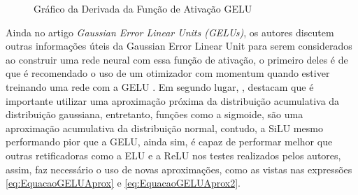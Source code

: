 \begin{figure}[htbp]
    \centering
    \caption{Gráfico da Derivada da Função de Ativação GELU}
    \label{fig:GraficoGELUDerivada}
\end{figure}

Ainda no artigo \textit{Gaussian Error Linear Units (GELUs)}, os autores discutem outras informações úteis da Gaussian Error Linear Unit para serem considerados ao construir uma rede neural com essa função de ativação, o primeiro deles é de que é recomendado o uso de um otimizador com momentum quando estiver treinando uma rede com a GELU \parencite{GELUArticle}. Em segundo lugar, \textcite{GELUArticle}, destacam que é importante utilizar uma aproximação próxima da distribuição acumulativa da distribuição gaussiana, entretanto, funções como a sigmoide, são uma aproximação acumulativa da distribuição normal, contudo, a SiLU mesmo performando pior que a GELU, ainda sim, é capaz de performar melhor que outras retificadoras como a ELU e a ReLU nos testes realizados pelos autores, assim, faz necessário o uso de novas aproximações, como as vistas nas expressões \ref{eq:EquacaoGELUAprox} e \ref{eq:EquacaoGELUAprox2}.